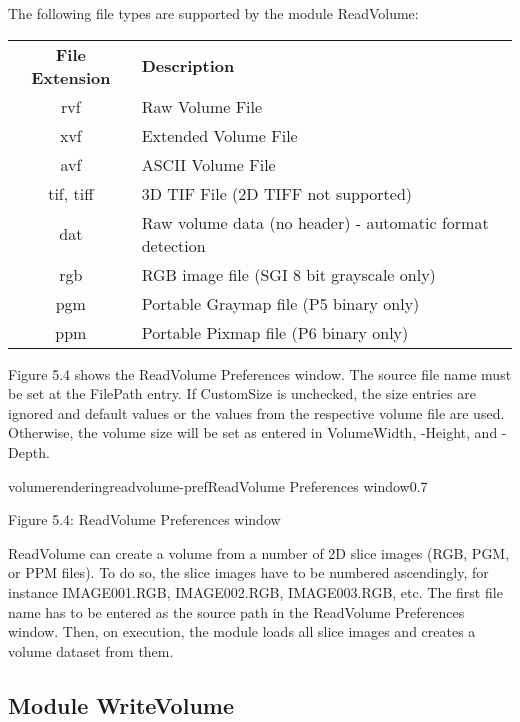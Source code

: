 The following file types are supported by the module ReadVolume:

\begin{table}
\begin{tabular}{|c|l|}
\hline 
{\bf File Extension} & {\bf Description} \\
rvf & Raw Volume File \\ %
xvf & Extended Volume File \\ %
avf & ASCII Volume File \\ %
tif, tiff & 3D TIF File (2D TIFF not supported) \\ %
dat & Raw volume data (no header) - automatic format detection \\ %
rgb & RGB image file (SGI 8 bit grayscale only) \\ %
pgm & Portable Graymap file (P5 binary only) \\ %
ppm & Portable Pixmap file (P6 binary only) \\ 
\hline
\end{tabular}
\end{table}

Figure 5.4 shows the ReadVolume Preferences window. The source file name must be set at the FilePath
entry. If CustomSize is unchecked, the size entries are ignored and default values or the values
from the respective volume file are used. Otherwise, the volume size will be
set as entered in VolumeWidth, -Height, and -Depth.

\begin{covimg}{volumerendering}{readvolume-pref}{ReadVolume Preferences window}{0.7}\end{covimg}
\begin{htmlonly}
Figure 5.4: ReadVolume Preferences window
\vspace{0.5cm}
\end{htmlonly}

ReadVolume can create a volume from a number of 2D slice images (RGB, PGM, or PPM files). 
To do so, the slice images have to be numbered ascendingly, 
for instance IMAGE001.RGB, IMAGE002.RGB, IMAGE003.RGB, etc. The first file name has
to be entered as the source path in the ReadVolume Preferences window. 
Then, on execution, the module loads all slice images and creates a volume dataset from them. 

\subsection{Module WriteVolume}

